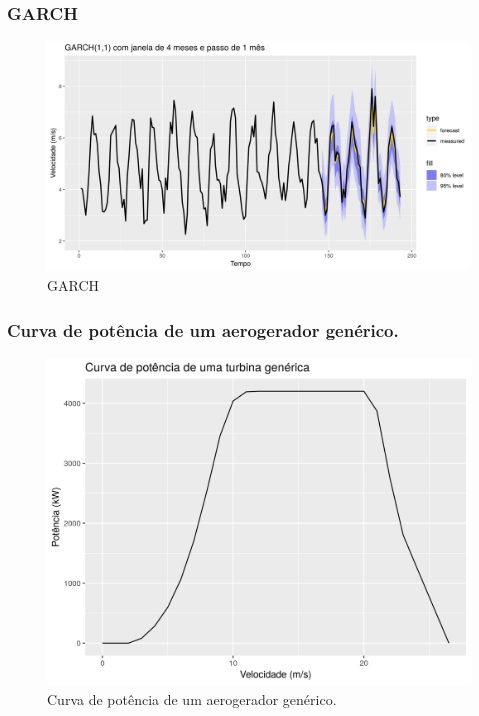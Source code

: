 \documentclass{beamer}
\begin{document}
\begin{frame}
	\frametitle{GARCH}
	\begin{figure}
		\centering
		\includegraphics[width=\textwidth]{garch_month}
		\caption{GARCH}
	\end{figure}
\end{frame}

\begin{frame}
	\frametitle{Curva de potência de um aerogerador genérico.}
	\begin{figure}
		\centering
		\includegraphics[width=\textwidth]{power_curve}
		\caption{Curva de potência de um aerogerador genérico.}
	\end{figure}
\end{frame}
\end{document}
